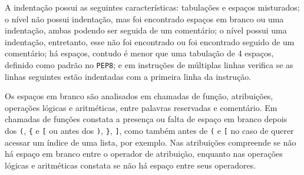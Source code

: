 	A indentação possui as seguintes características: tabulações e espaços misturados;
	o nível não possui indentação, mas foi encontrado espaços em branco ou uma indentação,
	ambas podendo ser seguida de um comentário; o nível possui uma indentação, entretanto,
	esse não foi encontrado ou foi encontrado seguido de um comentário; há espaços, contudo
	é menor que uma tabulação de 4 espaços, definido como padrão no \texttt{PEP8}; e em
	instruções de múltiplas linhas verifica se as linhas seguintes estão indentadas com
	a primeira linha da instrução.
	
	Os espaços em branco são analisados em chamadas de função, atribuições, operações
	lógicas e aritméticas, entre palavras reservadas e comentário. Em chamadas de
	funções constata a presença ou falta de espaço em branco depois dos 
	\texttt{(}, \texttt{\{} e \texttt{[} ou antes dos  \texttt{)},
	\texttt{\}}, \texttt{]}, como também antes de \texttt{(} e \texttt{[} no caso de
	querer acessar um índice de uma lista, por exemplo. Nas atribuições compreende se
	não há espaço em branco entre o operador de atribuição, enquanto nas operações
	lógicas e aritméticas constata se não há espaço entre seus operadores.
	
	
	
	
	
	
	
